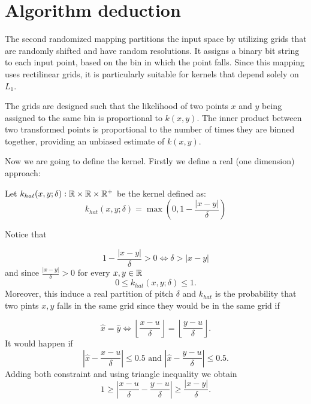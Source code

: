     
\section{Algorithm deduction} 

The second randomized mapping partitions the input space by utilizing grids that are randomly shifted and have random resolutions. It assigns a binary bit string to each input point, based on the bin in which the point falls. Since this mapping uses rectilinear grids, it is particularly suitable for kernels that depend solely on $L_1$.

The grids are designed such that the likelihood of two points $x$ and $y$ being assigned to the same bin is proportional to $k(x,y)$. The inner product between two transformed points is proportional to the number of times they are binned together, providing an unbiased estimate of $k(x,y)$.


Now we are going to define the kernel. Firstly we define a real (one dimension) approach: 

Let  $k_{hat}(x, y; \delta) : \mathbb{R} \times \mathbb{R} \times \mathbb{R}^+$ be the kernel defined as: 
\begin{equation}
    k_{hat}(x, y; \delta)
    = 
    \max 
    \left(
    0,
    1 - \frac{|x-y|}{\delta}
    \right)  
\end{equation}

Notice that 

\begin{equation}
    1 - \frac{|x-y|}{\delta} > 0
    \Leftrightarrow
    \delta > |x-y |
\end{equation}
and since $\frac{|x-y|}{\delta} > 0$ for every $x,y \in \mathbb{R}$
\begin{equation}
     0 \leq k_{hat}(x, y; \delta) \leq 1.
\end{equation} 
Moreover, this induce a real partition of pitch $\delta$ and $k_{hat}$ is the probability that two pints $x,y$ falls in the same grid since 
they would be in the same grid if 

\begin{equation}
 \hat{x} = \hat{y}
   \Leftrightarrow
        \left\lfloor
            \frac{x-u}{\delta}
        \right\rfloor
        = 
        \left\lfloor
        \frac{y-u}{\delta}
    \right\rfloor
.
\end{equation}
It would happen if
\begin{equation}
    \left| 
        \hat{x} - \frac{x-u}{\delta}
    \right|
    \leq 0.5
    \text{ and }
    \left| 
        \hat{x} - \frac{y-u}{\delta}
    \right|
    \leq 0.5.
\end{equation}
Adding both constraint and using triangle inequality we obtain 
\begin{equation}
    1 \geq \left| 
        \frac{x-u}{\delta} - \frac{y-u}{\delta}
    \right|
    \geq
        \frac{ |x-y|}{\delta}.
\end{equation}

